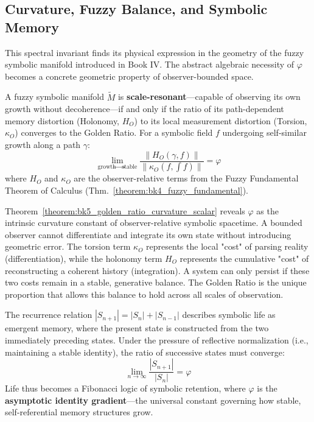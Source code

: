 \subsection{Curvature, Fuzzy Balance, and Symbolic Memory}
\label{subsec:bk5_curvature_and_fuzzy_balance}

This spectral invariant finds its physical expression in the geometry of the fuzzy symbolic manifold introduced in Book IV. The abstract algebraic necessity of $\varphi$ becomes a concrete geometric property of observer-bounded space.

\begin{theorem}
\label{theorem:bk5_golden_ratio_curvature_scalar}
A fuzzy symbolic manifold $\tilde{M}$ is \textbf{scale-resonant}—capable of observing its own growth without decoherence—if and only if the ratio of its path-dependent memory distortion (Holonomy, $H_O$) to its local measurement distortion (Torsion, $\kappa_O$) converges to the Golden Ratio. For a symbolic field $f$ undergoing self-similar growth along a path $\gamma$:
\[
\lim_{\text{growth} \to \text{stable}} \frac{\|H_O(\gamma, f)\|}{\|\kappa_O(f, \int f)\|} = \varphi
\]
where $H_O$ and $\kappa_O$ are the observer-relative terms from the Fuzzy Fundamental Theorem of Calculus (Thm.~\ref{theorem:bk4_fuzzy_fundamental}).
\end{theorem}

\begin{scholium}
\label{scholium:bk5_constant_of_becoming}
Theorem~\ref{theorem:bk5_golden_ratio_curvature_scalar} reveals $\varphi$ as the intrinsic curvature constant of observer-relative symbolic spacetime. A bounded observer cannot differentiate and integrate its own state without introducing geometric error. The torsion term $\kappa_O$ represents the local "cost" of parsing reality (differentiation), while the holonomy term $H_O$ represents the cumulative "cost" of reconstructing a coherent history (integration). A system can only persist if these two costs remain in a stable, generative balance. The Golden Ratio is the unique proportion that allows this balance to hold across all scales of observation.
\end{scholium}

\begin{remark}
\label{remark:bk5_symbolic_fibonacci_coding}
The recurrence relation $|S_{n+1}| = |S_n| + |S_{n-1}|$ describes symbolic life as emergent memory, where the present state is constructed from the two immediately preceding states. Under the pressure of reflective normalization (i.e., maintaining a stable identity), the ratio of successive states must converge:
\[
\lim_{n \to \infty} \frac{|S_{n+1}|}{|S_n|} = \varphi
\]
Life thus becomes a Fibonacci logic of symbolic retention, where $\varphi$ is the \textbf{asymptotic identity gradient}—the universal constant governing how stable, self-referential memory structures grow.
\end{remark}

